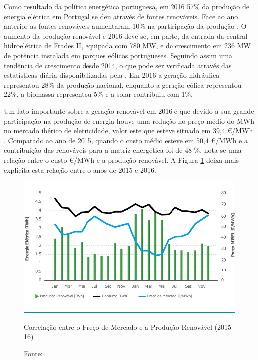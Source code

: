 Como resultado da política energética portuguesa, em 2016  57\% da produção de energia elétrica em Portugal se deu através de fontes renováveis. Face ao ano anterior as fontes renováveis aumentaram 10\% na participação da produção \cite[p.~8]{REN}. O aumento da produção renovável e 2016 deve-se, em parte, da entrada da central hidroelétrica de Frades II, equipada com 780 MW, e do crescimento em 236 MW de potência instalada em parques eólicos portugueses. Seguindo assim uma tendência de crescimento desde 2014, o que pode ser verificada através das estatísticas diária disponibilizadas pela .  Em 2016 a geração hidráulica representou 28\% da produção nacional, enquanto a geração eólica representou 22\%, a biomassa representou 5\% e a solar contribuiu com 1\%.

Um fato importante sobre a geração renovável em 2016 é que devido a sua grande participação na produção de energia houve uma redução no preço médio do MWh no mercado ibérico de eletricidade, valor este que esteve situado em 39,4 \euro/MWh \cite[p.~4]{apren}. Comparado ao ano de 2015, quando o custo médio esteve em 50,4 \euro/MWh e a contribuição das renováveis para a matriz energética foi de 48 \%, nota-se uma relação entre o custo \euro/MWh e a  produção renovável. A Figura \ref{fig:CorrelacaoPrecoMercadoProducaoRenovavel} deixa mais explicita esta relação entre o anos de 2015 e 2016.

\begin{figure}[H]
	\centering
	\captionsetup{width=0.85\textwidth, font=footnotesize, textfont=bf}
	\includegraphics[width=0.8\linewidth]{img/CorrelacaoPrecoMercadoProducaoRenovavel.pdf}
	\caption{Correlação entre o Preço de Mercado e a Produção Renovável (2015-16) }
	\vspace{-3.5mm}
	\caption*{Fonte: }
	\label{fig:CorrelacaoPrecoMercadoProducaoRenovavel}
\end{figure}


